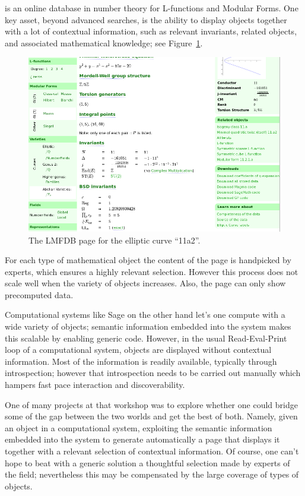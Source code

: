 \documentclass{deliverablereport}
\begin{document}
\LMFDB is an online database in number theory for L-functions and
Modular Forms. One key asset, beyond advanced searches, is the ability
to display objects together with a lot of contextual information, such
as relevant invariants, related objects, and associated mathematical
knowledge; see Figure~\ref{fig:lmfdb-11a2}.
\begin{figure}[h]
  \begin{center}
    \includegraphics[width=\textwidth]{images/LMFDB-11a2}
  \end{center}
  \caption{The LMFDB page for the elliptic curve ``11a2''.}
  \label{fig:lmfdb-11a2}
\end{figure}
For each type of mathematical object the content of the page is
handpicked by experts, which ensures a highly relevant selection.
However this process does not scale well when the variety of objects
increases. Also, the page can only show precomputed data.

Computational systems like Sage on the other hand let's one compute
with a wide variety of objects; semantic information embedded into the
system makes this scalable by enabling generic code. However, in the
usual Read-Eval-Print loop of a computational system, objects are
displayed without contextual information. Most of the information is
readily available, typically through introspection; however that
introspection needs to be carried out manually which hampers fast pace
interaction and discoverability.

One of many projects at that workshop was to explore whether one could
bridge some of the gap between the two worlds and get the best of
both. Namely, given an object in a computational system, exploiting
the semantic information embedded into the system to generate
automatically a page that displays it together with a relevant
selection of contextual information. Of course, one can't hope to beat
with a generic solution a thoughtful selection made by experts of the
field; nevertheless this may be compensated by the large coverage of
types of objects.
\end{document}
